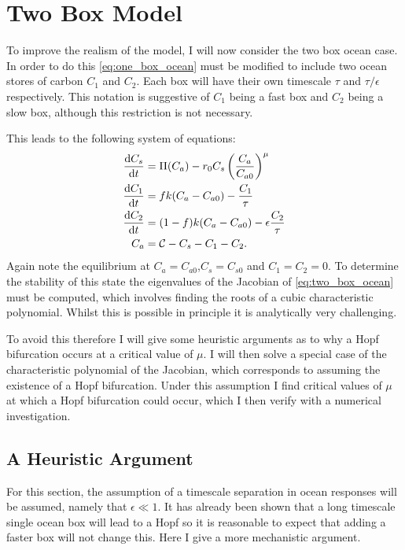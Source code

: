 \section{Two Box Model}
To improve the realism of the model, I will now consider the two box ocean case. In order to do this \cref{eq:one_box_ocean} must be modified to include
two ocean stores of carbon $C_1$ and $C_2$. Each box will have their own timescale $\tau$ and $\tau/\epsilon$ respectively. This notation is suggestive of
$C_1$ being a fast box and $C_2$ being a slow box, although this restriction is not necessary.

This leads to the following system of equations:
\begin{subequations}
  \begin{align}
    \label{eq:two_box_ocean}
    \dv{C_s}{t} &= \Pi(C_a) - r_0 C_s \left(\frac{C_a}{C_{a0}}\right)^{\mu} \\
    \dv{C_1}{t} &= fk(C_a - C_{a0}) - \frac{C_1}{\tau} \\
    \dv{C_2}{t} &= (1-f)k(C_a-C_{a0}) - \epsilon\frac{C_2}{\tau} \\
    C_a &= \mathcal{C} - C_s - C_1 - C_2.
  \end{align}
\end{subequations}
Again note the equilibrium at $C_a = C_{a0}$,$C_s = C_{s0}$ and $C_1 = C_2 = 0$. To determine the stability of this state the eigenvalues of the Jacobian
of \cref{eq:two_box_ocean} must be computed, which involves finding the roots of a cubic characteristic polynomial.
Whilst this is possible in principle it is analytically very challenging.

To avoid this therefore I will give some heuristic arguments as to why a Hopf bifurcation occurs at a critical value of $\mu$. I will then solve a special case
of the characteristic polynomial of the Jacobian, which corresponds to assuming the existence of a Hopf bifurcation. Under this assumption I find
critical values of $\mu$ at which a Hopf bifurcation could occur, which I then verify with a numerical investigation.

\subsection{A Heuristic Argument}
For this section, the assumption of a timescale separation in ocean responses will be assumed, namely that $\epsilon \ll 1$. It has already been shown that a long timescale
single ocean box will lead to a Hopf so it is reasonable to expect that adding a faster box will not change this. Here I give a more mechanistic argument.

